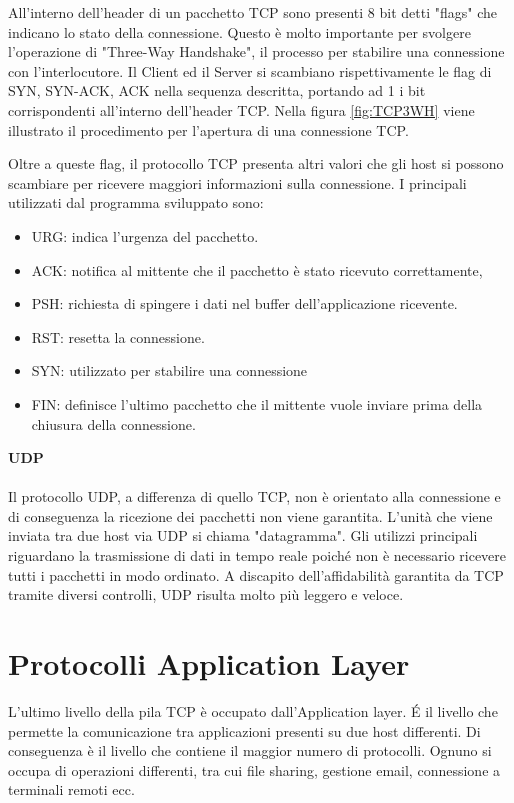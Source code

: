 \documentclass[12pt]{report}
\begin{document}
All'interno dell'header di un pacchetto TCP sono presenti 8 bit detti "flags" che indicano lo stato della connessione. Questo è molto importante per svolgere l'operazione di "Three-Way Handshake", il processo per stabilire una connessione con l'interlocutore. Il Client ed il Server si scambiano rispettivamente le flag di SYN, SYN-ACK, ACK nella sequenza descritta, portando ad 1 i bit corrispondenti all'interno dell'header TCP. Nella figura \ref{fig:TCP3WH} viene illustrato il procedimento per l'apertura di una connessione TCP.

Oltre a queste flag, il protocollo TCP presenta altri valori che gli host si possono scambiare per ricevere maggiori informazioni sulla connessione. I principali utilizzati dal programma sviluppato sono:
\begin{itemize}
    \item URG: indica l'urgenza del pacchetto.
    \item ACK: notifica al mittente che il pacchetto è stato ricevuto correttamente,
    \item PSH: richiesta di spingere i dati nel buffer dell'applicazione ricevente.
    \item RST: resetta la connessione.
    \item SYN: utilizzato per stabilire una connessione 
    \item FIN: definisce l'ultimo pacchetto che il mittente vuole inviare prima della chiusura della connessione.
\end{itemize}
\textbf{UDP}
\\\\
Il protocollo UDP, a differenza di quello TCP, non è orientato alla connessione e di conseguenza la ricezione dei pacchetti non viene garantita. L'unità che viene inviata tra due host via UDP si chiama "datagramma". Gli utilizzi principali riguardano la trasmissione di dati in tempo reale poiché non è necessario ricevere tutti i pacchetti in modo ordinato. A discapito dell'affidabilità garantita da TCP tramite diversi controlli, UDP risulta molto più leggero e veloce.\cite{rfcUDP}

\section{Protocolli Application Layer}

L'ultimo livello della pila TCP è occupato dall'Application layer. \'{E} il livello che permette la comunicazione tra applicazioni presenti su due host differenti. Di conseguenza è il livello che contiene il maggior numero di protocolli. Ognuno si occupa di operazioni differenti, tra cui file sharing, gestione email, connessione a terminali remoti ecc.
\end{document}
